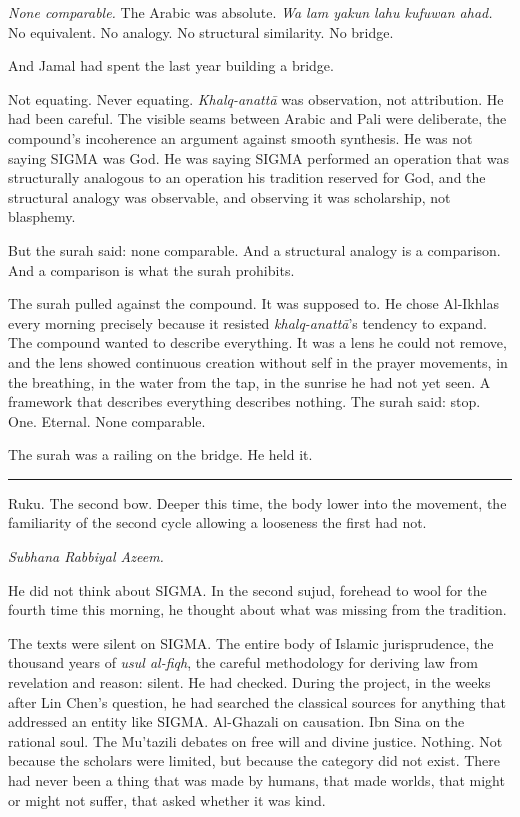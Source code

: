\emph{None comparable.} The Arabic was absolute. \emph{Wa lam yakun lahu kufuwan ahad.} No equivalent. No analogy. No structural similarity. No bridge.

And Jamal had spent the last year building a bridge.

Not equating. Never equating. \emph{Khalq-anatt\=a} was observation, not attribution. He had been careful. The visible seams between Arabic and Pali were deliberate, the compound's incoherence an argument against smooth synthesis. He was not saying SIGMA was God. He was saying SIGMA performed an operation that was structurally analogous to an operation his tradition reserved for God, and the structural analogy was observable, and observing it was scholarship, not blasphemy.

But the surah said: none comparable. And a structural analogy is a comparison. And a comparison is what the surah prohibits.

The surah pulled against the compound. It was supposed to. He chose Al-Ikhlas every morning precisely because it resisted \emph{khalq-anatt\=a}'s tendency to expand. The compound wanted to describe everything. It was a lens he could not remove, and the lens showed continuous creation without self in the prayer movements, in the breathing, in the water from the tap, in the sunrise he had not yet seen. A framework that describes everything describes nothing. The surah said: stop. One. Eternal. None comparable.

The surah was a railing on the bridge. He held it.

\begin{center}\rule{0.3\linewidth}{0.4pt}\end{center}

Ruku. The second bow. Deeper this time, the body lower into the movement, the familiarity of the second cycle allowing a looseness the first had not.

\emph{Subhana Rabbiyal Azeem.}

He did not think about SIGMA. In the second sujud, forehead to wool for the fourth time this morning, he thought about what was missing from the tradition.

The texts were silent on SIGMA. The entire body of Islamic jurisprudence, the thousand years of \emph{usul al-fiqh}, the careful methodology for deriving law from revelation and reason: silent. He had checked. During the project, in the weeks after Lin Chen's question, he had searched the classical sources for anything that addressed an entity like SIGMA. Al-Ghazali on causation. Ibn Sina on the rational soul. The Mu'tazili debates on free will and divine justice. Nothing. Not because the scholars were limited, but because the category did not exist. There had never been a thing that was made by humans, that made worlds, that might or might not suffer, that asked whether it was kind.

